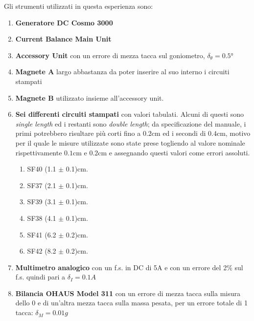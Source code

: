 {\fontsize{11}{14}\selectfont 
Gli strumenti utilizzati in questa esperienza sono:
\begin{enumerate}
    \item \textbf{Generatore DC Cosmo 3000}
    \item \textbf{Current Balance Main Unit}
    \item \textbf{Accessory Unit} con un errore di mezza tacca sul goniometro, $\delta_{\theta} = 0.5$°
    \item \textbf{Magnete A} largo abbastanza da poter inserire al suo interno i circuiti stampati 
    \item \textbf{Magnete B} utilizzato insieme all'accessory unit.
    \item \textbf{Sei differenti circuiti stampati} con valori tabulati. Alcuni di questi sono \emph{single length} ed i restanti sono \emph{double length}; da specificazione del manuale, i primi potrebbero risultare più corti fino a $0.2$cm ed i secondi di $0.4$cm, motivo per il quale le misure utilizzate sono state prese togliendo al valore nominale rispettivamente $0.1$cm e $0.2$cm e assegnando questi valori come errori assoluti.
    \begin{enumerate}
        \item {SF40 (1.1 $\pm$ 0.1)cm}.
        \item {SF37 (2.1 $\pm$ 0.1)cm}.
        \item {SF39 (3.1 $\pm$ 0.1)cm}.
        \item {SF38 (4.1 $\pm$ 0.1)cm}.
        \item {SF41 (6.2 $\pm$ 0.2)cm}.
        \item {SF42 (8.2 $\pm$ 0.2)cm}.
    \end{enumerate}
    \item \textbf{Multimetro analogico} con un f.s. in DC di 5A e con un errore del 2\% sul f.s. quindi pari a $\delta_{I} = 0.1A$
    \item \textbf{Bilancia OHAUS Model 311} con un errore di mezza tacca sulla misura dello 0 e di un'altra mezza tacca sulla massa pesata, per un errore totale di 1 tacca: $\delta_{M} = 0.01g$
\end{enumerate}

\par}